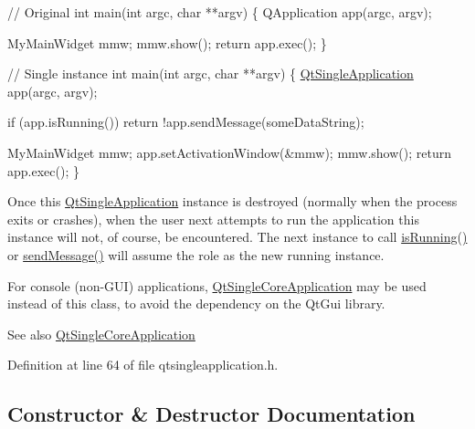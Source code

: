 \begin{DoxyCode}
\textcolor{comment}{// Original}
\textcolor{keywordtype}{int} main(\textcolor{keywordtype}{int} argc, \textcolor{keywordtype}{char} **argv)
\{
    QApplication app(argc, argv);

    MyMainWidget mmw;
    mmw.show();
    \textcolor{keywordflow}{return} app.exec();
\}

\textcolor{comment}{// Single instance}
\textcolor{keywordtype}{int} main(\textcolor{keywordtype}{int} argc, \textcolor{keywordtype}{char} **argv)
\{
    \hyperlink{class_qt_single_application}{QtSingleApplication} app(argc, argv);

    \textcolor{keywordflow}{if} (app.isRunning())
        \textcolor{keywordflow}{return} !app.sendMessage(someDataString);

    MyMainWidget mmw;
    app.setActivationWindow(&mmw);
    mmw.show();
    \textcolor{keywordflow}{return} app.exec();
\}
\end{DoxyCode}


Once this \hyperlink{class_qt_single_application}{Qt\+Single\+Application} instance is destroyed (normally when the process exits or crashes), when the user next attempts to run the application this instance will not, of course, be encountered. The next instance to call \hyperlink{class_qt_single_application_aa9f0e6e4f18ac79bbb7a955cd860894d}{is\+Running()} or \hyperlink{class_qt_single_application_a0e2f3900f0290913c738ec6b4b959922}{send\+Message()} will assume the role as the new running instance.

For console (non-\/\+G\+UI) applications, \hyperlink{class_qt_single_core_application}{Qt\+Single\+Core\+Application} may be used instead of this class, to avoid the dependency on the Qt\+Gui library.

\begin{DoxySeeAlso}{See also}
\hyperlink{class_qt_single_core_application}{Qt\+Single\+Core\+Application} 
\end{DoxySeeAlso}


Definition at line 64 of file qtsingleapplication.\+h.



\subsection{Constructor \& Destructor Documentation}
